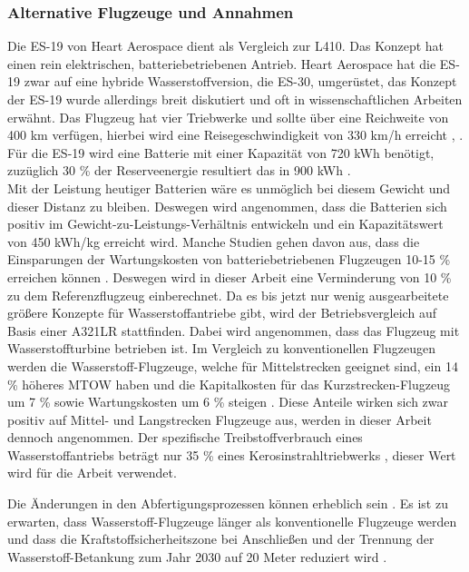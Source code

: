 \subsubsection{Alternative Flugzeuge und Annahmen}
Die ES-19 von Heart Aerospace dient als Vergleich zur L410. 
Das Konzept hat einen rein elektrischen, batteriebetriebenen Antrieb.
Heart Aerospace hat die ES-19 zwar auf eine hybride Wasserstoffversion, die ES-30, umgerüstet, 
das Konzept der ES-19 wurde allerdings breit diskutiert und oft in wissenschaftlichen Arbeiten erwähnt. 
Das Flugzeug hat vier Triebwerke und sollte über eine Reichweite von 400 km verfügen, 
hierbei wird eine Reisegeschwindigkeit von 330 km/h erreicht  \cite{anker2023feasibility}, \cite{heart_aerospace_es19}.
Für die ES-19 wird eine Batterie mit einer Kapazität von 720 kWh benötigt,
zuzüglich 30 \% der Reserveenergie resultiert das in 900 kWh \cite{donckers2024electric}. \\
Mit der Leistung heutiger Batterien wäre es unmöglich bei diesem Gewicht und dieser Distanz zu bleiben.
Deswegen wird angenommen, dass die Batterien sich positiv im Gewicht-zu-Leistungs-Verhältnis 
entwickeln und ein Kapazitätswert von 450 kWh/kg erreicht wird.
Manche Studien gehen davon aus, dass die Einsparungen der Wartungskosten 
von batteriebetriebenen Flugzeugen 10-15 \% erreichen können \cite{wangsness2021fremskyndet,avogadro2024demystifying}. 
Deswegen wird in dieser Arbeit eine Verminderung von 10 \% zu dem Referenzflugzeug einberechnet.
%
Da es bis jetzt nur wenig ausgearbeitete größere Konzepte für Wasserstoffantriebe gibt, 
wird der Betriebsvergleich auf Basis einer A321LR stattfinden. 
Dabei wird angenommen, dass das Flugzeug mit Wasserstoffturbine betrieben ist.
Im Vergleich zu konventionellen Flugzeugen werden die Wasserstoff-Flugzeuge, 
welche für Mittelstrecken geeignet sind, ein 14 \% höheres MTOW haben und die Kapitalkosten 
für das Kurzstrecken-Flugzeug um 7 \% sowie Wartungskosten um 6 \% steigen \cite{sky2020hydrogen}. 
Diese Anteile wirken sich zwar positiv auf Mittel- und Langstrecken Flugzeuge aus, 
werden in dieser Arbeit dennoch angenommen.
Der spezifische Treibstoffverbrauch eines Wasserstoffantriebs beträgt nur 35 \% 
eines Kerosinstrahltriebwerks \cite{scholz2021parameterselection}, dieser Wert wird für die Arbeit verwendet.

Die Änderungen in den Abfertigungsprozessen können erheblich sein \cite{ati_hydrogen_infrastructure}. 
%
Es ist zu erwarten, dass Wasserstoff-Flugzeuge länger als konventionelle Flugzeuge werden
und dass die Kraftstoffsicherheitszone bei Anschließen und der Trennung 
der Wasserstoff-Betankung zum Jahr 2030 auf 20 Meter reduziert wird \cite{hoelzen2022h2}.

